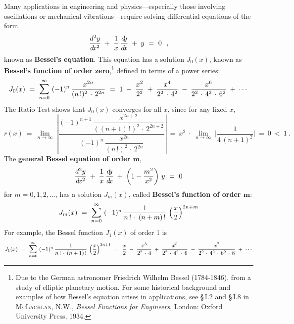 Many applications in engineering and physics---especially those involving
oscillations or mechanical vibrations---require solving differential equations
of the form
\begin{equation}\label{eqn:besseldiffeq}
\frac{d^2y}{d\!x^2} \;+\; \frac{1}{x}\,\frac{d\negmedspace y}{d\!x} \;+\; y ~=~ 0 ~~,
\end{equation}
known as \textbf{Bessel's equation}. This equation has
a solution $J_0(x)$, known as
\textbf{Bessel's function of order zero},\footnote{Due to the German astronomer
Friedrich Wilhelm Bessel (1784-1846), from a study of elliptic planetary
motion. For some historical background and examples of how Bessel's equation
arises in applications, see \S\,I.2 and \S\,I.8 in \textsc{McLachlan, N.W.},
\emph{Bessel Functions for Engineers}, London: Oxford University Press, 1934.}
defined in terms of a power series:
\begin{equation}\label{eqn:besselzero}
J_0(x) ~=~ \bigsum{n = 0}{\infty}~ (-1)^n\,\frac{x^{2n}}{(n\,!)^2\,\cdot\,2^{2n}} ~=~
1 \;-\; \frac{x^2}{2^2} \;+\; \frac{x^4}{2^2 \,\cdot\, 4^2} \;-\;
\frac{x^6}{2^2 \,\cdot\, 4^2 \,\cdot\, 6^2} \;+\; \cdots
\end{equation}
The Ratio Test shows that $J_0(x)$ converges for all $x$, since for any fixed
$x$,
\[
r(x) ~=~ \lim_{n \to \infty} \;\left|\dfrac{(-1)^{n+1}\,\dfrac{x^{2n+2}}{((n+1)\,!)^2\,\cdot\,2^{2n+2}}}
{(-1)^n\,\dfrac{x^{2n}}{(n\,!)^2\,\cdot\,2^{2n}}}\right| ~=~
x^2 \;\cdot\; \lim_{n \to \infty} \;\Biggl|\frac{1}{4\,(n+1)^2}\Biggr| ~=~ 0 ~<~ 1 ~.
\]
\newpage
\noindent The \textbf{general Bessel equation of order $\bm{m}$},
\begin{equation}\label{eqn:besseldiffeqgen}
\frac{d^2y}{d\!x^2} \;+\; \frac{1}{x}\,\frac{d\negmedspace y}{d\!x} \;+\;
\left(1 - \frac{m^2}{x^2}\right)\,y ~=~ 0
\end{equation}
for $m=0,1,2,\ldots$, has a
solution $J_m(x)$, called
\textbf{Bessel's function of order $\bm{m}$}:
\begin{equation}\label{eqn:besselm}\index{Bessel functions!order $m$}
J_m(x) ~=~ \bigsum{n = 0}{\infty}~ (-1)^n\,\frac{1}{n\,! \,\cdot\, (n+m)\,!}\,
\left(\frac{x}{2}\right)^{2n+m}
\end{equation}
For example, the Bessel function $J_1(x)$ of order 1 is
\[
J_1(x) ~=~ \bigsum{n = 0}{\infty}~ (-1)^n\,\frac{1}{n\,! \,\cdot\, (n+1)\,!}\,
\left(\frac{x}{2}\right)^{2n+1} ~=~ \frac{x}{2} \;-\; \frac{x^3}{2^2 \,\cdot\, 4} \;+\;
\frac{x^5}{2^2 \,\cdot\, 4^2 \,\cdot\, 6} \;-\;
\frac{x^7}{2^2 \,\cdot\, 4^2 \,\cdot\, 6^2 \,\cdot\, 8} \;+\; \cdots
\]
